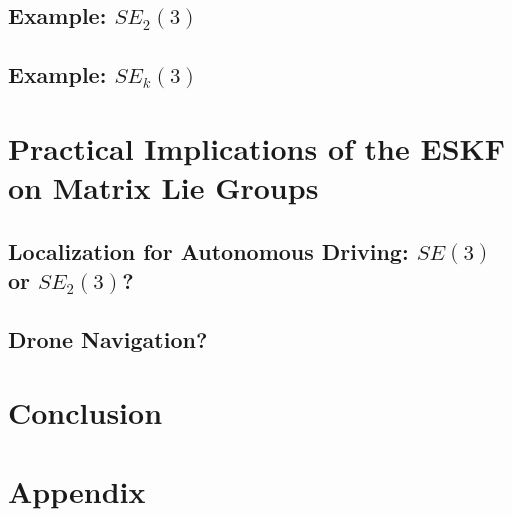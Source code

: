 \documentclass{article}
\begin{document}
\subsection{Example: $SE_{2}(3)$}
\subsection{Example: $SE_{k}(3)$}

\section{Practical Implications of the ESKF on Matrix Lie Groups}
\subsection{Localization for Autonomous Driving: $SE(3)$ or $SE_{2}(3)$?}
\subsection{Drone Navigation?}

\section{Conclusion}
\section{Appendix}



\end{document}
